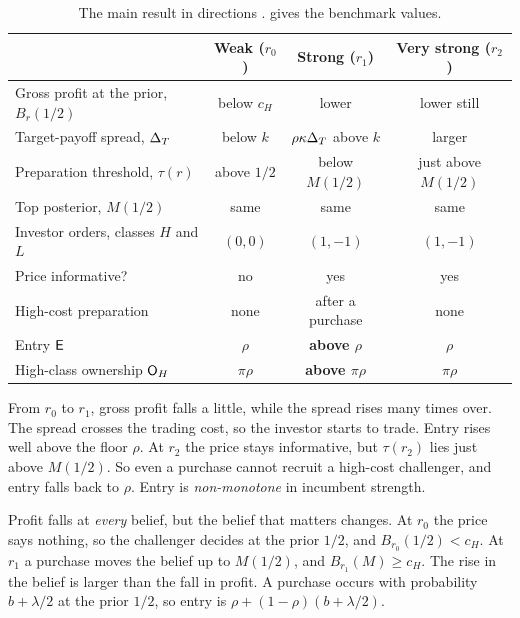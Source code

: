 \begin{table}[htbp]
\centering\small
\begin{tabular}{@{}lccc@{}}
\toprule
 & Weak (\(r_0\)) & Strong (\(r_1\)) & Very strong (\(r_2\))\\
\midrule
Gross profit at the prior, \(B_r(1/2)\) & below \(c_H\) & lower & lower still\\
Target-payoff spread, \(\Delta_T\) & below \(k\) & \(\rho\kappa\Delta_T\) above \(k\) & larger\\
Preparation threshold, \(\tau(r)\) & above \(1/2\) & below \(M(1/2)\) & just above \(M(1/2)\)\\
Top posterior, \(M(1/2)\) & same & same & same\\
Investor orders, classes \(H\) and \(L\) & \((0,0)\) & \((1,-1)\) & \((1,-1)\)\\
Price informative? & no & yes & yes\\
High-cost preparation & none & after a purchase & none\\
Entry \(\mathsf{E}\) & \(\rho\) & \textbf{above \(\rho\)} & \(\rho\)\\
High-class ownership \(\mathsf{O}_H\) & \(\pi\rho\) & \textbf{above \(\pi\rho\)} & \(\pi\rho\)\\
\bottomrule
\end{tabular}
\caption{The main result in directions .  gives the
benchmark values.}
\label{tab:01_brief-numbers}
\end{table}

From \(r_0\) to \(r_1\), gross profit falls a little, while the spread rises many times over. The spread
crosses the trading cost, so the investor starts to trade. Entry rises well above the floor \(\rho\).
At \(r_2\) the price stays informative, but \(\tau(r_2)\) lies just above \(M(1/2)\). So even a purchase cannot
recruit a high-cost challenger, and entry falls back to \(\rho\). Entry is \emph{non-monotone} in incumbent
strength.

\begin{intuition}
Profit falls at \emph{every} belief, but the belief that matters changes. At \(r_0\) the price says nothing,
so the challenger decides at the prior \(1/2\), and \(B_{r_0}(1/2)<c_H\). At \(r_1\) a purchase moves the
belief up to \(M(1/2)\), and \(B_{r_1}(M)\ge c_H\). The rise in the belief is larger than the fall in profit.
A purchase occurs with probability \(b+\lambda/2\) at the prior \(1/2\), so entry is
\(\rho+(1-\rho)(b+\lambda/2)\).
\end{intuition}

